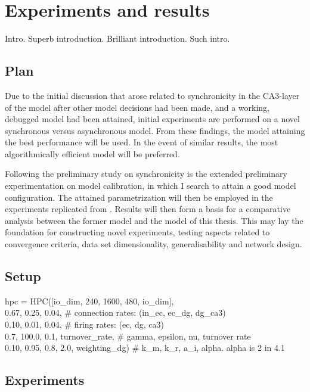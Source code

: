 
\chapter{Experiments and results}\label{chpt:experiments}

Intro. Superb introduction. Brilliant introduction. Such intro.

\section{Plan}

Due to the initial discussion that arose related to synchronicity in the CA3-layer of the model after other model decisions had been made, and a working, debugged model had been attained, initial experiments are performed on a novel synchronous versus asynchronous model. From these findings, the model attaining the best performance will be used. In the event of similar results, the most algorithmically efficient model will be preferred.

Following the preliminary study on synchronicity is the extended preliminary experimentation on model calibration, in which I search to attain a good model configuration. The attained parametrization will then be employed in the experiments replicated from \citep{Hattori2014}. Results will then form a basis for a comparative analysis between the former model and the model of this thesis. This may lay the foundation for constructing novel experiments, testing aspects related to convergence criteria, data set dimensionality, generalisability and network design.

\section{Setup}

hpc = HPC([io\_dim, 240, 1600, 480, io\_dim], \\
          0.67, 0.25, 0.04,  \# connection rates: (in\_ec, ec\_dg, dg\_ca3) \\
          0.10, 0.01, 0.04,  \# firing rates: (ec, dg, ca3) \\
          0.7, 100.0, 0.1, turnover\_rate,  \# gamma, epsilon, nu, turnover rate \\
          0.10, 0.95, 0.8, 2.0, weighting\_dg)  \# k\_m, k\_r, a\_i, alpha. alpha is 2 in 4.1
          
\section{Experiments}
